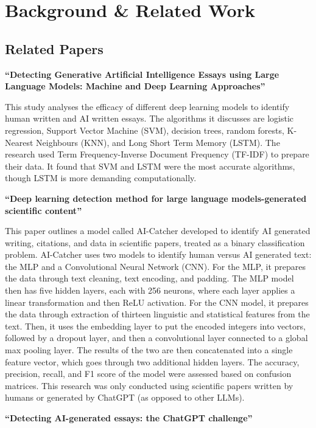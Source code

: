 \documentclass{article} %
\begin{document}
\section{Background \& Related Work}

\subsection{Related Papers}

\textbf{``Detecting Generative Artificial Intelligence Essays using Large Language Models: Machine and Deep Learning Approaches''}

This study analyses the efficacy of different deep learning models to identify human written and AI written essays. The algorithms it discusses are logistic regression, Support Vector Machine (SVM), decision trees, random forests, K-Nearest Neighbours (KNN), and Long Short Term Memory (LSTM). The research used Term Frequency-Inverse Document Frequency (TF-IDF) to prepare their data. It found that SVM and LSTM were the most accurate algorithms, though LSTM is more demanding computationally.

\textbf{``Deep learning detection method for large language models-generated scientific content''}

This paper outlines a model called AI-Catcher developed to identify AI generated writing, citations, and data in scientific papers, treated as a binary classification problem. AI-Catcher uses two models to identify human versus AI generated text: the MLP and a Convolutional Neural Network (CNN). For the MLP, it prepares the data through text cleaning, text encoding, and padding. The MLP model then has five hidden layers, each with 256 neurons, where each layer applies a linear transformation and then ReLU activation. For the CNN model, it prepares the data through extraction of thirteen linguistic and statistical features from the text. Then, it uses the embedding layer to put the encoded integers into vectors, followed by a dropout layer, and then a convolutional layer connected to a global max pooling layer. The results of the two are then concatenated into a single feature vector, which goes through two additional hidden layers. The accuracy, precision, recall, and F1 score of the model were assessed based on confusion matrices. This research was only conducted using scientific papers written by humans or generated by ChatGPT (as opposed to other LLMs).

\textbf{``Detecting AI-generated essays: the ChatGPT challenge''}
\end{document}
